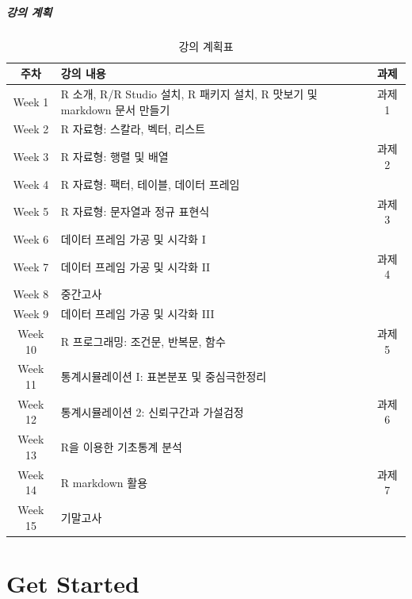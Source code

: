 \documentclass[
  11pt,
]{krantz}
\begin{document}
\hypertarget{course-schedule}{%
\subsubsection*{강의 계획}\label{course-schedule}}


\begin{table}[H]

\caption{\label{tab:make-schedule-tab}강의 계획표}
\centering
\fontsize{10}{12}\selectfont
\begin{tabular}[t]{c>{\raggedright\arraybackslash}p{6cm}c}
\toprule
주차 & 강의 내용 & 과제\\
\midrule
\rowcolor{gray!6}  Week 1 & R 소개, R/R Studio 설치, R 패키지 설치, R 맛보기 및 markdown 문서 만들기 & 과제 1\\
Week 2 & R 자료형: 스칼라, 벡터, 리스트 & \\
\rowcolor{gray!6}  Week 3 & R 자료형: 행렬 및 배열 & 과제 2\\
Week 4 & R 자료형: 팩터, 테이블, 데이터 프레임 & \\
\rowcolor{gray!6}  Week 5 & R 자료형: 문자열과 정규 표현식 & 과제 3\\
\addlinespace
Week 6 & 데이터 프레임 가공 및 시각화 I & \\
\rowcolor{gray!6}  Week 7 & 데이터 프레임 가공 및 시각화 II & 과제 4\\
Week 8 & 중간고사 & \\
\rowcolor{gray!6}  Week 9 & 데이터 프레임 가공 및 시각화 III & \\
Week 10 & R 프로그래밍: 조건문, 반복문, 함수 & 과제 5\\
\addlinespace
\rowcolor{gray!6}  Week 11 & 통계시뮬레이션 I: 표본분포 및 중심극한정리 & \\
Week 12 & 통계시뮬레이션 2: 신뢰구간과 가설검정 & 과제 6\\
\rowcolor{gray!6}  Week 13 & R을 이용한 기초통계 분석 & \\
Week 14 & R markdown 활용 & 과제 7\\
\rowcolor{gray!6}  Week 15 & 기말고사 & \\
\bottomrule
\end{tabular}
\end{table}

\mainmatter

\hypertarget{part-get-started}{%
\part{Get Started}\label{part-get-started}}
\end{document}
